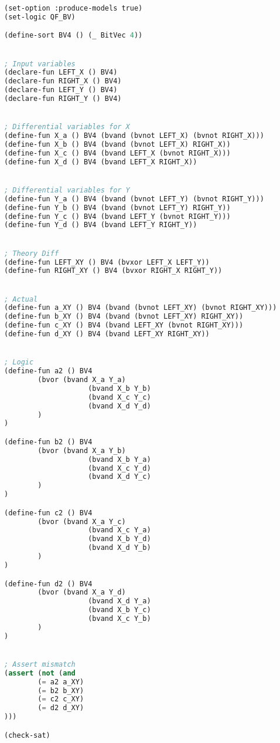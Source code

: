 \begin{lstlisting}[language=lisp, caption={XOR logic proof}, label=lst:xor-proof]
(set-option :produce-models true)
(set-logic QF_BV)

(define-sort BV4 () (_ BitVec 4))


; Input variables
(declare-fun LEFT_X () BV4)
(declare-fun RIGHT_X () BV4)
(declare-fun LEFT_Y () BV4)
(declare-fun RIGHT_Y () BV4)


; Differential variables for X
(define-fun X_a () BV4 (bvand (bvnot LEFT_X) (bvnot RIGHT_X)))
(define-fun X_b () BV4 (bvand (bvnot LEFT_X) RIGHT_X))
(define-fun X_c () BV4 (bvand LEFT_X (bvnot RIGHT_X)))
(define-fun X_d () BV4 (bvand LEFT_X RIGHT_X))


; Differential variables for Y
(define-fun Y_a () BV4 (bvand (bvnot LEFT_Y) (bvnot RIGHT_Y)))
(define-fun Y_b () BV4 (bvand (bvnot LEFT_Y) RIGHT_Y))
(define-fun Y_c () BV4 (bvand LEFT_Y (bvnot RIGHT_Y)))
(define-fun Y_d () BV4 (bvand LEFT_Y RIGHT_Y))


; Theory Diff
(define-fun LEFT_XY () BV4 (bvxor LEFT_X LEFT_Y))
(define-fun RIGHT_XY () BV4 (bvxor RIGHT_X RIGHT_Y))


; Actual
(define-fun a_XY () BV4 (bvand (bvnot LEFT_XY) (bvnot RIGHT_XY)))
(define-fun b_XY () BV4 (bvand (bvnot LEFT_XY) RIGHT_XY))
(define-fun c_XY () BV4 (bvand LEFT_XY (bvnot RIGHT_XY)))
(define-fun d_XY () BV4 (bvand LEFT_XY RIGHT_XY))


; Logic
(define-fun a2 () BV4
		(bvor (bvand X_a Y_a)
					(bvand X_b Y_b)
					(bvand X_c Y_c)
					(bvand X_d Y_d)
		)
)

(define-fun b2 () BV4
		(bvor (bvand X_a Y_b)
					(bvand X_b Y_a)
					(bvand X_c Y_d)
					(bvand X_d Y_c)
		)
)

(define-fun c2 () BV4
		(bvor (bvand X_a Y_c)
					(bvand X_c Y_a)
					(bvand X_b Y_d)
					(bvand X_d Y_b)
		)
)

(define-fun d2 () BV4
		(bvor (bvand X_a Y_d)
					(bvand X_d Y_a)
					(bvand X_b Y_c)
					(bvand X_c Y_b)
		)
)


; Assert mismatch
(assert (not (and
		(= a2 a_XY)
		(= b2 b_XY)
		(= c2 c_XY)
		(= d2 d_XY)
)))

(check-sat)
\end{lstlisting}

